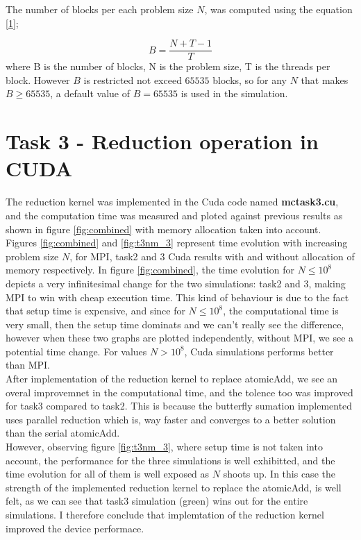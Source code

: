 \documentclass[12pt,a4paper]{article}
\begin{document}
\noindent The number of blocks per each problem size $N$, was computed using the equation \eqref{1};

\begin{equation}
	B = \dfrac{N + T -1 }{T}
	\label{1}
\end{equation}
where B is the number of blocks, N is the problem size, T is the threads per block. However $B$ is restricted not exceed $65535$ blocks, so for any $N$ that makes $B \ge 65535$, a default value of $B= 65535$ is used in the simulation.

\section*{Task 3 - Reduction operation in CUDA}

The reduction kernel was implemented in the Cuda code named \textbf{mc\textunderscore task3.cu}, and the computation time was measured and ploted against previous results as shown in figure \ref{fig:combined} with memory allocation taken into account. \\

\noindent Figures \ref{fig:combined} and \ref{fig:t3nm_3} represent time evolution with increasing problem size $N$, for MPI, task2 and 3 Cuda results with and without allocation of memory respectively. In figure \ref{fig:combined}, the time evolution for $N\le10^{8}$ depicts a very infinitesimal change for the two simulations: task2 and 3, making MPI to win with cheap execution time. This kind of behaviour is due to the fact that setup time is expensive, and since for $N\le10^{8}$, the computational time is very small, then the setup time dominats and we can't really see the difference, however when these two graphs are plotted independently, without MPI, we see a potential time change. For values $N>10^{8}$, Cuda simulations performs better than MPI. \\

\noindent After implementation of the reduction kernel to replace atomicAdd, we see an overal  improvemnet in the computational time, and the tolence too was improved for task3 compared to task2. This is because the butterfly sumation implemented uses parallel reduction which is,  way faster and converges to a better solution than the serial atomicAdd.\\

\noindent However, observing figure \ref{fig:t3nm_3}, where setup time is not taken into account, the performance for the three simulations is well exhibitted, and the time evolution for all of them is well exposed as $N$ shoots up. In this case the strength of the implemented reduction kernel to replace the atomicAdd, is well felt, as we can see that task3 simulation (green) wins out for the entire simulations. I therefore conclude that implemtation of the reduction kernel improved the device performace. 
\end{document}
